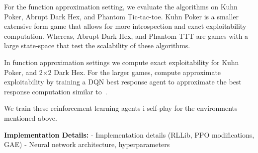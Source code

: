 For the function approximation setting, we evaluate the algorithms on Kuhn Poker, Abrupt Dark Hex,
and Phantom Tic-tac-toe.
Kuhn Poker is a smaller extensive form game that allows for more introspection and exact exploitability computation.
Whereas, Abrupt Dark Hex, and Phantom TTT are games with a large state-space that test the scalability of these
algorithms.

In function approximation settings we compute exact exploitability for Kuhn Poker,
and 2$\times$2 Dark Hex.
For the larger games, compute approximate exploitability by training a DQN best response agent to approximate
the best response computation similar to~\cite{sokotaUnified2023}.

We train these reinforcement learning agents i self-play for the environments mentioned above.


\textbf{Implementation Details:} 
- Implementation details (RLLib, PPO modifications, GAE)
- Neural network architecture, hyperparameters

